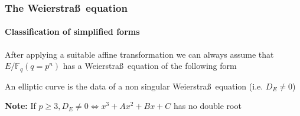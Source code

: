 \documentclass[handout]{beamer}%
\newcommand{\F}{\mathbb F}
\theoremstyle{definition}
\begin{document}
\begin{frame}
\frametitle{The Weierstra\ss\ equation}
\framesubtitle{Classification of simplified forms}

After applying a suitable affine transformation we can always assume that $E/\F_q (q=p^n)$
has a Weierstra\ss\ equation of the following form\pause

\begin{scriptsize}
\end{scriptsize}\pause

\vspace*{-1cm}
\begin{definition} An elliptic curve is the data of a non
singular Weierstra\ss\ equation (i.e. ${D}_E\neq0$)
\end{definition}\pause

\centerline{\alert{\textbf{Note:} If $p\ge3, {D}_E\neq0\Leftrightarrow x^3+Ax^2+Bx+C$ has {no} double root}}
\end{frame}
\end{document}
